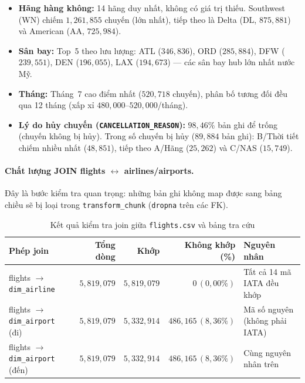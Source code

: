 \begin{itemize}
    \item \textbf{Hãng hàng không:} 14 hãng duy nhất, không có giá trị thiếu.
          Southwest (WN) chiếm $1{,}261{,}855$ chuyến (lớn nhất),
          tiếp theo là Delta (DL, $875{,}881$) và American (AA, $725{,}984$).

    \item \textbf{Sân bay:} Top~5 theo lưu lượng: ATL ($346{,}836$), ORD ($285{,}884$),
          DFW ($239{,}551$), DEN ($196{,}055$), LAX ($194{,}673$) ---
          các sân bay hub lớn nhất nước Mỹ.

    \item \textbf{Tháng:} Tháng~7 cao điểm nhất ($520{,}718$ chuyến),
          phân bố tương đối đều qua 12 tháng (xấp xỉ $480{,}000$--$520{,}000$/tháng).

    \item \textbf{Lý do hủy chuyến (\texttt{CANCELLATION\_REASON}):}
          $98{,}46\%$ bản ghi để trống (chuyến không bị hủy).
          Trong số chuyến bị hủy ($89{,}884$ bản ghi):
          B/Thời tiết chiếm nhiều nhất ($48{,}851$),
          tiếp theo A/Hãng ($25{,}262$) và C/NAS ($15{,}749$).
\end{itemize}

\paragraph{Chất lượng JOIN flights $\leftrightarrow$ airlines/airports.}

Đây là bước kiểm tra quan trọng: những bản ghi không map được sang bảng chiều
sẽ bị loại trong \texttt{transform\_chunk} (\texttt{dropna} trên các FK).

\begin{table}[H]
\centering
\caption{Kết quả kiểm tra join giữa \texttt{flights.csv} và bảng tra cứu}
\vspace{4pt}
\small
\begin{tabular}{|l|r|r|r|p{3cm}|}
\hline
\textbf{Phép join} & \textbf{Tổng dòng} & \textbf{Khớp} & \textbf{Không khớp (\%)} & \textbf{Nguyên nhân} \\ \hline
flights $\to$ \texttt{dim\_airline}
  & $5{,}819{,}079$ & $5{,}819{,}079$ & $0\,(0{,}00\%)$
  & Tất cả 14 mã IATA đều khớp \\ \hline
flights $\to$ \texttt{dim\_airport} (đi)
  & $5{,}819{,}079$ & $5{,}332{,}914$ & $486{,}165\,(8{,}36\%)$
  & Mã số nguyên (không phải IATA) \\ \hline
flights $\to$ \texttt{dim\_airport} (đến)
  & $5{,}819{,}079$ & $5{,}332{,}914$ & $486{,}165\,(8{,}36\%)$
  & Cùng nguyên nhân trên \\ \hline
\end{tabular}
\label{tab:eda_join_impl}
\end{table}

